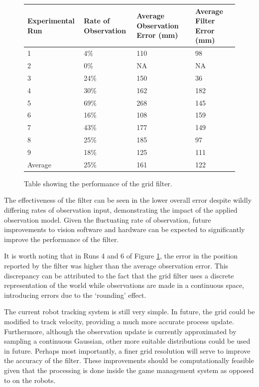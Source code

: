 \documentclass[runningheads,a4paper]{llncs}
\begin{document}
\begin{figure}[H]
\begin{center}
    \begin{tabular}{ | l | l | p{3cm} | p{3cm} | }
    \hline
    	Experimental Run & Rate of Observation & Average Observation Error (mm) & Average Filter Error (mm) \\ \hline
	1 & 4\% & 110 & 98 \\ \hline
	2 & 0\% & NA & NA \\ \hline
	3 & 24\% & 150 & 36 \\ \hline
	4 & 30\% & 162 & 182 \\ \hline
	5 & 69\% & 268 & 145 \\ \hline
	6 & 16\% & 108 & 159 \\ \hline
	7 & 43\% & 177 & 149 \\ \hline
	8 & 25\% & 185 & 97 \\ \hline
	9 & 18\% & 125 & 111 \\ \hline
	Average & 25\% & 161 & 122 \\ \hline
    \end{tabular}
\end{center}
  \caption{Table showing the performance of the grid filter.}
 \label{fig:gridexperiment}
\end{figure}

The effectiveness of the filter can be seen in the lower overall error despite wildly differing rates of observation input, demonstrating the impact of the applied observation model. Given the fluctuating rate of observation, future improvements to vision software and hardware can be expected to significantly improve the performance of the filter.

It is worth noting that in Runs 4 and 6 of Figure \ref{fig:gridexperiment}, the error in the position reported by the filter was higher than the average observation error. This discrepancy can be attributed to the fact that the grid filter uses a discrete representation of the world while observations are made in a continuous space, introducing errors due to the `rounding' effect.

The current robot tracking system is still very simple. In future, the grid could be modified to track velocity, providing a much more accurate process update. Furthermore, although the observation update is currently approximated by sampling a continuous Gaussian, other more suitable distributions could be used in future. Perhaps most importantly, a finer grid resolution will serve to improve the accuracy of the filter. These improvements should be computationally feasible given that the processing is done inside the game management system as opposed to on the robots.
\end{document}
